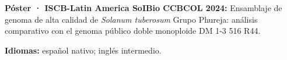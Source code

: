 \documentclass[11pt,letterpaper]{awesome-cv}
\renewenvironment{cvparagraph}{\par\vspace{2mm}\paragraphstyle}{\par\vspace{2mm}}
\begin{document}
\begin{cvparagraph}
\textbf{Póster · ISCB-Latin America SoIBio CCBCOL 2024:} Ensamblaje de genoma de alta calidad de \textit{Solanum tuberosum} Grupo Phureja: análisis comparativo con el genoma público doble monoploide DM 1-3 516 R44.
\end{cvparagraph}
\begin{cvparagraph}
\textbf{Idiomas:} español nativo; inglés intermedio.
\end{cvparagraph}
\end{document}
